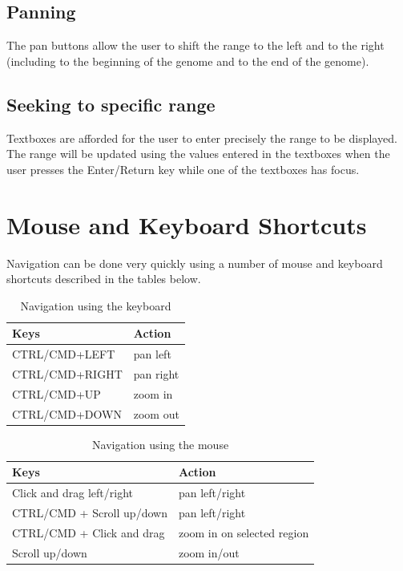 \documentclass{report}
\begin{document}
\subsection{Panning}

The pan buttons allow the user to shift the range to the left and to the right (including to the beginning of the genome and to the end of the genome). 

\subsection{Seeking to specific range}

Textboxes are afforded for the user to enter precisely the range to be displayed. The range will be updated using the values entered in the textboxes when the user presses the Enter/Return key while one of the textboxes has focus.

\section{Mouse and Keyboard Shortcuts}

Navigation can be done very quickly using a number of mouse and keyboard shortcuts described in the tables below.

\begin{table}[h] 
\caption{Navigation using the keyboard}  
\begin{tabular*}{6in}{ l l }  
\hline                      
Keys & Action \\
\hline                    
CTRL/CMD+LEFT & pan left  \\
CTRL/CMD+RIGHT & pan right \\ 
CTRL/CMD+UP & zoom in \\     
CTRL/CMD+DOWN & zoom out \\  
\hline     
\end{tabular*} 
\end{table} 

\begin{table}[h] 
\caption{Navigation using the mouse}  
\begin{tabular*}{6in}{ l l }  
\hline                      
Keys & Action \\
\hline            
Click and drag left/right & pan left/right  \\
CTRL/CMD + Scroll up/down & pan left/right  \\
CTRL/CMD + Click and drag  & zoom in on selected region  \\
Scroll up/down & zoom in/out  \\
\hline     
\end{tabular*} 
\end{table} 
\end{document}
